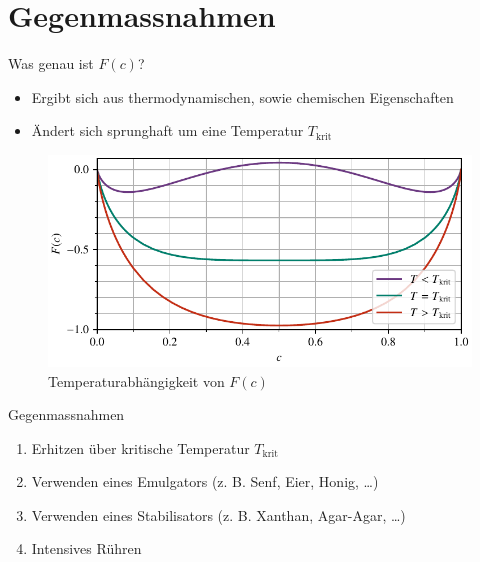 
\section{Gegenmassnahmen}

\begin{frame}{Was genau ist $F(c)$?}
\begin{itemize}
\item Ergibt sich aus thermodynamischen,
sowie chemischen Eigenschaften
\item Ändert sich \glqq sprunghaft\grqq{} um eine Temperatur $T_\text{krit}$
\end{itemize}
\begin{figure}
\centering
\includegraphics[scale=0.8]{images/energy}
\caption{Temperaturabhängigkeit von $F(c)$}
\label{fig:fc}
\end{figure}
\end{frame}

\begin{frame}{Gegenmassnahmen}
\begin{enumerate}
\item<+-> Erhitzen über kritische Temperatur $T_\text{krit}$
\item<+-> Verwenden eines Emulgators (z. B. Senf, Eier, Honig, \ldots)
\item<+-> Verwenden eines Stabilisators (z. B. Xanthan, Agar-Agar, \ldots)
\item<+-> Intensives Rühren
\end{enumerate}
\end{frame}

